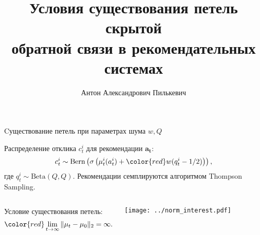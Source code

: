 \documentclass{beamer}
\title[\hbox to 56mm{Петли скрытой обратной связи}]{ Условия существования петель скрытой \\ обратной связи в рекомендательных системах }
\author[А.\,А. Пилькевич]{Антон Александрович Пилькевич}
\institute{Московский физико-технический институт}
\date{\footnotesize
\par\smallskip\emph{Курс:} Автоматизация научных исследований\par (практика, В.\,В.~Стрижов)/Группа 813
\par\smallskip\emph{Эксперт:} А.\,С.~Хританков
\par\smallskip\emph{Консультант:} А.\,С.~Хританков
\par\bigskip\small 2021}
\begin{document}
\begin{frame}
\thispagestyle{empty}
\maketitle
\end{frame}
\begin{frame}{Cуществование петель при параметрах шума $w, Q$}

Распределение отклика $c_t^i$ для рекомендации $\mathbf{a_t}$:
\begin{gather*}
  c_t^i \sim \text{Bern} \left(\sigma\left( \mu_t^i (a_t^i) + \mathbin{\color{red}w (q_t^i -1/2)} \right) \right), 
\end{gather*}
где $q_t^i \sim \text{Beta}(Q, Q)$. 
Рекомендации семплируются алгоритмом Thompson Sampling.
\begin{columns}[c]
Условие существования петель: 
\begin{gather*}
  \color{red} \lim_{t \to \infty} \|\mu_t - \mu_0 \|_2 = \infty.
\end{gather*}
\begin{center}
  \texttt{[image: ../norm\_interest.pdf]}
\end{center}
\end{columns}
\end{frame}
\end{document}
